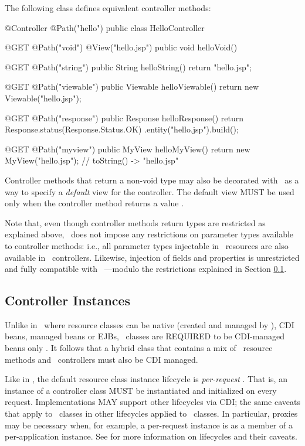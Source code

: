 The following class defines equivalent controller methods:

\begin{listing}{1}
@Controller
@Path("hello")
public class HelloController {

    @GET @Path("void")
    @View("hello.jsp")
    public void helloVoid() {
    }
    
    @GET @Path("string")
    public String helloString() {
        return "hello.jsp";
    }
    
    @GET @Path("viewable")
    public Viewable helloViewable() {
        return new Viewable("hello.jsp");
    }
    
    @GET @Path("response")
    public Response helloResponse() {
        return Response.status(Response.Status.OK)
                       .entity("hello.jsp").build();
    }    

    @GET @Path("myview")
    public MyView helloMyView() {
        return new MyView("hello.jsp");    // toString() -> "hello.jsp"
    }       
}
\end{listing}

Controller methods that return a non-void type may also be decorated with \View\ as a 
way to specify a {\em default} view for the controller. The default view MUST be 
used only when the controller method returns a  value 
.

Note that, even though controller methods return types are restricted as 
explained above, \mvc\ does not impose any restrictions on parameter
types available to controller methods: i.e., all parameter types injectable
in \jaxrs\ resources are also available in \mvc\ controllers. Likewise, injection
of fields and properties is unrestricted and fully compatible with \jaxrs\ ---modulo
the restrictions explained in Section \ref{controller_instances}.

\subsection{Controller Instances}
\label{controller_instances}

Unlike in \jaxrs\ where resource classes can be native (created and managed by \jaxrs), 
CDI beans, managed beans or EJBs, \mvc\ classes are REQUIRED to be CDI-managed beans 
only . It follows that a hybrid class that contains a mix 
of \jaxrs\ resource methods and \mvc\ controllers must also be CDI managed. 

Like in \jaxrs, the default resource class instance lifecycle is {\em per-request}
.
That is, an instance of a controller class MUST be instantiated and initialized 
on every request. Implementations MAY support other lifecycles via CDI; the same caveats 
that apply to \jaxrs\ classes in other lifecycles applied to \mvc\ classes. In particular, 
proxies may be necessary when, for example, a per-request instance is as a member of a 
per-application instance. See \cite{jaxrs} for more information on lifecycles and 
their caveats.

